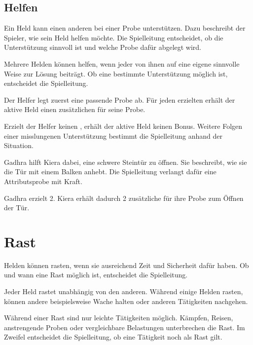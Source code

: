 \subsection{Helfen}

Ein Held kann einen anderen bei einer Probe unterstützen. Dazu beschreibt der Spieler, wie sein Held helfen möchte. Die Spielleitung entscheidet, ob die Unterstützung sinnvoll ist und welche Probe dafür abgelegt wird.

Mehrere Helden können helfen, wenn jeder von ihnen auf eine eigene sinnvolle Weise zur Lösung beiträgt. Ob eine bestimmte Unterstützung möglich ist, entscheidet die Spielleitung.

\begin{kurzregel}[title=Bei einer Probe helfen]
Der Helfer legt zuerst eine passende Probe ab. Für jeden erzielten \star{} erhält der aktive Held einen zusätzlichen \blueDie{} für seine Probe.

Erzielt der Helfer keinen \star{}, erhält der aktive Held keinen Bonus. Weitere Folgen einer misslungenen Unterstützung bestimmt die Spielleitung anhand der Situation.
\end{kurzregel}

\begin{beispiel}[title=Beispiel: Eine Steintür öffnen]
Gadhra hilft Kiera dabei, eine schwere Steintür zu öffnen. Sie beschreibt, wie sie die Tür mit einem Balken anhebt. Die Spielleitung verlangt dafür eine Attributsprobe mit Kraft.

Gadhra erzielt 2\star. Kiera erhält dadurch 2 zusätzliche \blueDie{} für ihre Probe zum Öffnen der Tür.
\end{beispiel}

\section{Rast}

Helden können rasten, wenn sie ausreichend Zeit und Sicherheit dafür haben. Ob und wann eine Rast möglich ist, entscheidet die Spielleitung.

Jeder Held rastet unabhängig von den anderen. Während einige Helden rasten, können andere beispielsweise Wache halten oder anderen Tätigkeiten nachgehen.

Während einer Rast sind nur leichte Tätigkeiten möglich. Kämpfen, Reisen, anstrengende Proben oder vergleichbare Belastungen unterbrechen die Rast. Im Zweifel entscheidet die Spielleitung, ob eine Tätigkeit noch als Rast gilt.

